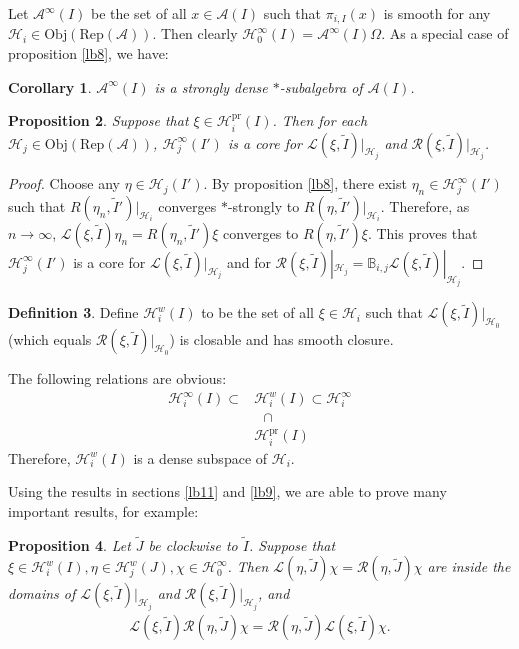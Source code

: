 \documentclass[11pt,b5paper,notitlepage]{article}
\theoremstyle{definition}
\newtheorem{df}{Definition}[subsection]
\theoremstyle{plain}
\newtheorem{pp}[df]{Proposition}
\newtheorem{co}[df]{Corollary}
\newcommand{\mc}{\mathcal}
\newcommand{\wtd}{\widetilde}
\newcommand{\scr}{\mathscr}
\newcommand{\RepA}{\mathrm{Rep}(\mc A)}
\newcommand{\mbb}{\mathbb}
\newcommand{\Obj}{\mathrm{Obj}}
\newcommand{\pr}{\mathrm{pr}}
\numberwithin{equation}{subsection}
\begin{document}
Let $\mc A^\infty(I)$ be the set of all $x\in\mc A(I)$ such that $\pi_{i,I}(x)$ is smooth for any $\mc H_i\in\Obj(\RepA)$. Then clearly $\mc H^\infty_0(I)=\mc A^\infty(I)\Omega$. As a special case of proposition \ref{lb8}, we have:

\begin{co}\label{lb24}
$\mc A^\infty(I)$ is a strongly dense $*$-subalgebra of $\mc A(I)$.
\end{co}

\begin{pp}\label{lb21}
Suppose that $\xi\in\mc H_i^\pr(I)$. Then for each $\mc H_j\in\Obj(\RepA)$, $\mc H_j^\infty(I')$ is a core for $\scr L(\xi,\wtd I)|_{\mc H_j}$ and $\scr R(\xi,\wtd I)|_{\mc H_j}$.
\end{pp}

\begin{proof}
Choose any $\eta\in\mc H_j(I')$. By proposition \ref{lb8}, there exist $\eta_n\in\mc H_j^\infty(I')$ such that $R(\eta_n,\wtd I')|_{\mc H_i}$ converges $*$-strongly to $R(\eta,\wtd I')|_{\mc H_i}$. Therefore, as $n\rightarrow\infty$, $\scr L(\xi,\wtd I)\eta_n=R(\eta_n,\wtd I')\xi$ converges to $R(\eta,\wtd I')\xi$. This proves that $\mc H_j^\infty(I')$ is a core for $\scr L(\xi,\wtd I)|_{\mc H_j}$ and for $\scr R(\xi,\wtd I)|_{\mc H_j}=\mbb B_{i,j}\scr L(\xi,\wtd I)|_{\mc H_j}$.
\end{proof}





\begin{df}
Define $\mc H_i^w(I)$ \index{Hi@$\mc H_i^w(I)$} to be the set of all $\xi\in\mc H_i$ such that $\scr L(\xi,\wtd I)|_{\mc H_0}$ (which equals $\scr R(\xi,\wtd I)|_{\mc H_0}$) is closable and has smooth closure. 
\end{df}

The following relations are obvious:
\begin{align*}
\mc H_i^\infty(I)\subset&\mc H_i^w(I)\subset\mc H_i^\infty\\
&~~~\cap\\
&\mc H_i^\pr(I)
\end{align*}
Therefore, $\mc H_i^w(I)$ is a dense subspace of $\mc H_i$.






Using the  results in sections \ref{lb11} and \ref{lb9}, we are able to prove many important results, for example:

\begin{pp}\label{lb28}
Let $\wtd J$ be clockwise to $\wtd I$. Suppose that $\xi\in\mc H_i^w(I),\eta\in\mc H_j^w(J),\chi\in\mc H_0^\infty$. Then $\scr L(\eta,\wtd J)\chi=\scr R(\eta,\wtd J)\chi$ are inside the domains of $\scr L(\xi,\wtd I)|_{\mc H_j}$ and $\scr R(\xi,\wtd I)|_{\mc H_j}$, and 
\begin{align}
\scr L(\xi,\wtd I)\scr R(\eta,\wtd J)\chi=\scr R(\eta,\wtd J)\scr L(\xi,\wtd I)\chi.
\end{align}
\end{pp}
\end{document}
